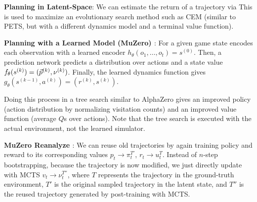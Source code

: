 \documentclass{article}
\begin{document}
  \textbf{Planning in Latent-Space}: We can estimate the return of a trajectory via
  This is used to maximize an evolutionary search method such as CEM (similar to PETS, but with a different dynamics model and a terminal value function).  

  \textbf{Planning with a Learned Model (MuZero) \cite{schrittwieser2020mastering}}: For a given game state encodes each observation with a learned encoder $h_\theta(o_1,\dots,o_t)=s^{(0)}$. Then, a prediction network predicts a distribution over actions and a state value $f_\theta(s^{(k)})=(\vec{p}^{(k)},\nu^{(k)})$. Finally, the learned dynamics function gives $g_\theta(s^{(k-1)},a^{(k)})=(r^{(k)},s^{(k)})$. 

  Doing this process in a tree search similar to AlphaZero gives an improved policy (action distribution by normalizing visitation counts) and an improved value function (average $Q$s over actions). Note that the tree search is executed with the actual environment, not the learned simulator.

  \textbf{MuZero Reanalyze \cite{schrittwieser2021online}}: We can reuse old trajectories by again training policy and reward to its corresponding values $p_t\to \pi_t^{T'}$, $r_t\to u_t^T$. Instead of $n$-step bootstrapping, because the trajectory is now modified, we just directly update with MCTS $v_t\to \nu_t^{T''}$, where $T$ represents the trajectory in the ground-truth environment, $T'$ is the original sampled trajectory in the latent state, and $T''$ is the reused trajectory generated by post-training with MCTS.  
\end{document}
